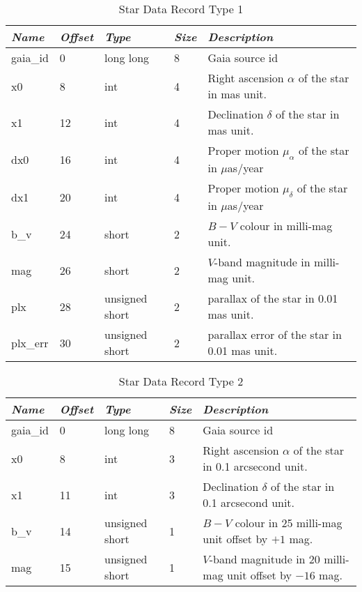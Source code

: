 \begin{table}[htbp]
\begin{tabularx}{\textwidth}{llllX}\toprule
\emph{Name} & \emph{Offset}& \emph{Type} & \emph{Size} &\emph{Description}\\\midrule
gaia\_id       &  0 & long long          & 8 & Gaia source id\\%
x0             &  8 & int                & 4 & Right ascension $\alpha$ of the star in mas unit.\\%
x1             & 12 & int                & 4 & Declination $\delta$ of the star in mas unit.\\%
dx0            & 16 & int                & 4 & Proper motion $\mu_{\alpha}$ of the star in $\mu$as/year\\%
dx1            & 20 & int                & 4 & Proper motion $\mu_{\delta}$ of the star in $\mu$as/year\\%
b\_v           & 24 & short              & 2 & $B-V$ colour in milli-mag unit.\\
mag            & 26 & short              & 2 & $V$-band magnitude in milli-mag unit.\\
plx            & 28 & unsigned short     & 2 & parallax of the star in 0.01 mas unit.\\
plx\_err       & 30 & unsigned short     & 2 & parallax error of the star in 0.01 mas unit.\\\bottomrule
\end{tabularx}
\caption{Star Data Record Type 1}
\label{tab:StarDataRecord1}
\end{table}


\begin{table}[htbp]
\begin{tabularx}{\textwidth}{llllX}\toprule
\emph{Name} & \emph{Offset} & \emph{Type} & \emph{Size} & \emph{Description}\\\midrule
gaia\_id       &  0 & long long          & 8 & Gaia source id\\%
x0             &  8 & int                & 3 & Right ascension $\alpha$ of the star in 0.1 arcsecond unit.\\%
x1             & 11 & int                & 3 & Declination $\delta$ of the star in 0.1 arcsecond unit.\\%
b\_v           & 14 & unsigned short     & 1 & $B-V$ colour in 25 milli-mag unit offset by $+1$ mag.\\
mag            & 15 & unsigned short     & 1 & $V$-band magnitude in 20 milli-mag unit offset by $-16$ mag.\\\bottomrule
\end{tabularx}
\caption{Star Data Record Type 2}
\label{tab:StarDataRecord2}
\end{table}


